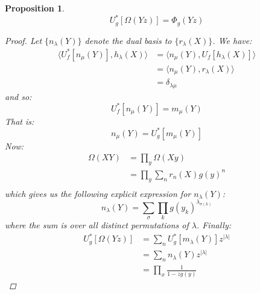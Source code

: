 \documentclass[12pt,dvips]{amsart}
\newtheorem{proposition}{Proposition}[section]
\begin{document}
\begin{proposition}
$$ U_g^*[\Omega(Yz)] = \Phi_{g}(Yz) $$
\begin{proof}
Let $\{n_\lambda(Y)\}$ denote the dual basis to $\{r_\lambda(X)\}$. We have:
\begin{align*}
\langle U^*_{f}[n_\mu(Y)], h_\lambda(X) \rangle 
& =  \langle n_\mu(Y), U_{f}[h_\lambda(X)] \rangle \\
& =  \langle n_\mu(Y), r_\lambda(X) \rangle \\
& =  \delta_{\lambda \mu}
\end{align*}
and so:
$$ U^*_{f}[n_\mu(Y)] = m_\mu(Y) $$
That is:
$$ n_\mu(Y) = U^*_{g}[m_\mu(Y)] $$
Now:
\begin{align*}
\Omega(XY) & =  \prod_{y} \Omega(Xy) \\
& =  \prod_{y} \sum_n r_n(X) g(y)^n \\
\end{align*}
which gives us the following explicit expression for $n_\lambda(Y)$:
$$ n_\lambda(Y) = \sum_{\sigma} \prod_k g(y_k)^{\lambda_{\sigma(k)}} $$
where the sum is over all distinct permutations of $\lambda$. Finally:
\begin{align*}
U^*_{g} [\Omega(Yz)] & =  \sum_n U^*_{g} [m_\lambda(Y)] z^{|\lambda|} \\
& =  \sum_n n_{\lambda}(Y) z^{|\lambda|} \\
& =  \prod_x \frac{1}{1-zg(y)}
\end{align*}
\qedhere
\end{proof}
\end{proposition}
\end{document}
